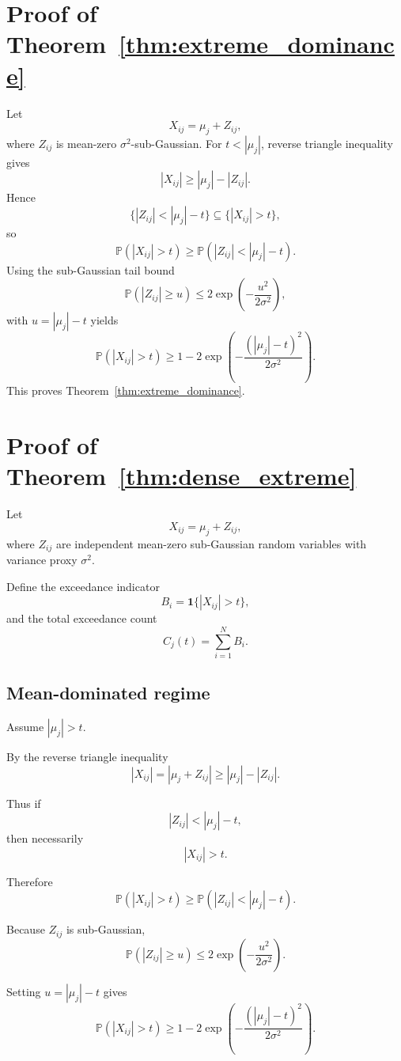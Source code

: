 \newpage

\section{Proof of Theorem~\ref{thm:extreme_dominance}}
\label{appendix:proof_extreme_dominance}

Let
\[
X_{ij}=\mu_j+Z_{ij},
\]
where $Z_{ij}$ is mean-zero $\sigma^2$-sub-Gaussian. For $t<|\mu_j|$, reverse triangle inequality gives
\[
|X_{ij}|\ge |\mu_j|-|Z_{ij}|.
\]
Hence
\[
\{|Z_{ij}|<|\mu_j|-t\}\subseteq \{|X_{ij}|>t\},
\]
so
\[
\mathbb{P}(|X_{ij}|>t)\ge \mathbb{P}(|Z_{ij}|<|\mu_j|-t).
\]
Using the sub-Gaussian tail bound
\[
\mathbb{P}(|Z_{ij}|\ge u)\le 2\exp\!\left(-\frac{u^2}{2\sigma^2}\right),
\]
with $u=|\mu_j|-t$ yields
\[
\mathbb{P}(|X_{ij}|>t)
\ge
1-2\exp\!\left(-\frac{(|\mu_j|-t)^2}{2\sigma^2}\right).
\]
This proves Theorem~\ref{thm:extreme_dominance}.

\newpage

\section{Proof of Theorem~\ref{thm:dense_extreme}}

Let
\[
X_{ij} = \mu_j + Z_{ij},
\]
where $Z_{ij}$ are independent mean-zero sub-Gaussian random variables with variance proxy $\sigma^2$.

Define the exceedance indicator
\[
B_i = \mathbf{1}\{|X_{ij}| > t\},
\]
and the total exceedance count
\[
C_j(t) = \sum_{i=1}^{N} B_i.
\]

\subsection{Mean-dominated regime}

Assume $|\mu_j| > t$.

By the reverse triangle inequality
\[
|X_{ij}| = |\mu_j + Z_{ij}| \ge |\mu_j| - |Z_{ij}|.
\]

Thus if
\[
|Z_{ij}| < |\mu_j| - t,
\]
then necessarily
\[
|X_{ij}| > t.
\]

Therefore
\[
\mathbb{P}(|X_{ij}| > t)
\ge
\mathbb{P}(|Z_{ij}| < |\mu_j| - t).
\]

Because $Z_{ij}$ is sub-Gaussian,
\[
\mathbb{P}(|Z_{ij}| \ge u)
\le
2\exp\!\left(-\frac{u^2}{2\sigma^2}\right).
\]

Setting $u = |\mu_j| - t$ gives
\[
\mathbb{P}(|X_{ij}| > t)
\ge
1 - 2\exp\!\left(-\frac{(|\mu_j|-t)^2}{2\sigma^2}\right).
\]

